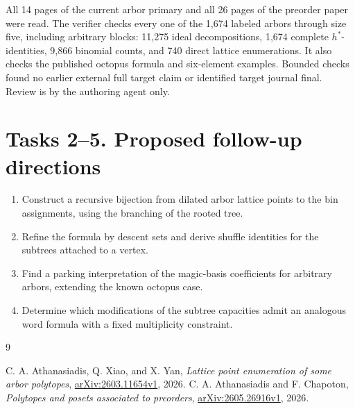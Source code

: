 \documentclass[11pt]{article}
\begin{document}
All 14 pages of the current arbor primary and all 26 pages of the
preorder paper were read. The verifier checks every one of the
1,674 labeled arbors through size five, including arbitrary blocks:
11,275 ideal decompositions, 1,674 complete $h^*$-identities,
9,866 binomial counts, and 740 direct lattice enumerations.
It also checks the published octopus formula and six-element examples.
Bounded checks found no earlier external full target claim or identified
target journal final. Review is by the authoring agent only.

\section*{Tasks 2--5. Proposed follow-up directions}
\begin{enumerate}[label=\textbf{Task \arabic*.},start=2,leftmargin=*]
\item Construct a recursive bijection from dilated arbor lattice
points to the bin assignments, using the branching of the rooted tree.
\item Refine the formula by descent sets and derive shuffle identities
for the subtrees attached to a vertex.
\item Find a parking interpretation of the magic-basis coefficients
for arbitrary arbors, extending the known octopus case.
\item Determine which modifications of the subtree capacities admit
an analogous word formula with a fixed multiplicity constraint.
\end{enumerate}
\begin{thebibliography}{9}
\raggedright
{} C. A. Athanasiadis, Q. Xiao, and X. Yan,
\emph{Lattice point enumeration of some arbor polytopes},
\href{https://arxiv.org/abs/2603.11654v1}{arXiv:2603.11654v1}, 2026.
 C. A. Athanasiadis and F. Chapoton,
\emph{Polytopes and posets associated to preorders},
\href{https://arxiv.org/abs/2605.26916v1}{arXiv:2605.26916v1}, 2026.
\end{thebibliography}
\end{document}
